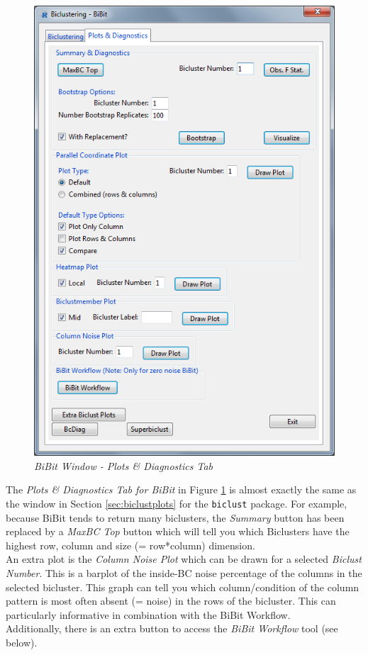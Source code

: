 \documentclass[a4paper]{article}\usepackage[]{graphicx}\usepackage[]{color}
\begin{document}
\begin{figure}[H]
\centering
\includegraphics[scale=0.5]{figures/bibit_plotdiagtab.png}
\caption{{\it BiBit Window - Plots \& Diagnostics Tab}\label{bibit_plotdiagtab}}
\end{figure} 

\noindent The {\it Plots \& Diagnostics Tab for BiBit} in Figure
\ref{bibit_plotdiagtab} is almost exactly the same as the window in Section \ref{sec:biclustplots} for the \texttt{biclust} package. For example, because BiBit tends to return many biclusters, the {\it Summary} button has been replaced by a {\it MaxBC Top} button which will tell you which Biclusters have the highest row, column and size (= row*column) dimension. \\
An extra plot is the {\it Column Noise Plot} which can be drawn for a selected {\it Biclust Number}. This is a barplot of the inside-BC noise percentage of the columns in the selected bicluster. This graph can tell you which column/condition of the column pattern is most often absent (= noise) in the rows of the bicluster. This can particularly informative in combination with the BiBit Workflow.\\
Additionally, there is an extra button to access the {\it BiBit Workflow} tool (see below).
\\ \\
\end{document}
